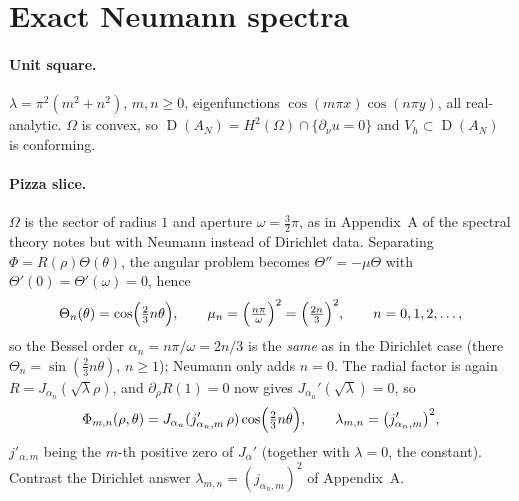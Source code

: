 \documentclass[11pt,a4paper]{article}
\DeclareMathOperator{\dom}{D}
\begin{document}
\section{Exact Neumann spectra}

\paragraph{Unit square.} $\lambda = \pi^2(m^2+n^2)$, $m,n\ge 0$, eigenfunctions
$\cos(m\pi x)\cos(n\pi y)$, all real-analytic. $\Omega$ is convex, so
$\dom(A_N) = H^2(\Omega)\cap\{\partial_\nu u = 0\}$ and $V_h \subset \dom(A_N)$
is conforming.

\paragraph{Pizza slice.} $\Omega$ is the sector of radius $1$ and aperture
$\omega = \tfrac32\pi$, as in Appendix~A of the spectral theory notes but with
Neumann instead of Dirichlet data. Separating $\Phi = R(\rho)\Theta(\theta)$,
the angular problem becomes $\Theta'' = -\mu\Theta$ with
$\Theta'(0)=\Theta'(\omega)=0$, hence
\begin{equation}
  \Theta_n(\theta) = \cos\Bigl(\tfrac{2}{3}n\theta\Bigr),
  \qquad
  \mu_n = \Bigl(\tfrac{n\pi}{\omega}\Bigr)^2 = \Bigl(\tfrac{2n}{3}\Bigr)^2,
  \qquad n = 0,1,2,\dots,
\end{equation}
so the Bessel order $\alpha_n = n\pi/\omega = 2n/3$ is the \emph{same} as in the
Dirichlet case (there $\Theta_n = \sin(\tfrac23 n\theta)$, $n \ge 1$); Neumann
only adds $n=0$. The radial factor is again $R = J_{\alpha_n}(\sqrt\lambda\rho)$,
and $\partial_\rho R(1) = 0$ now gives $J_{\alpha_n}'(\sqrt\lambda) = 0$, so
\begin{equation}
  \Phi_{m,n}(\rho,\theta) = J_{\alpha_n}(j'_{\alpha_n,m}\,\rho)\cos\Bigl(\tfrac23 n\theta\Bigr),
  \qquad
  \lambda_{m,n} = \bigl(j'_{\alpha_n,m}\bigr)^2,
\end{equation}
$j'_{\alpha,m}$ being the $m$-th positive zero of $J_\alpha'$ (together with
$\lambda = 0$, the constant). Contrast the Dirichlet answer
$\lambda_{m,n} = (j_{\alpha_n,m})^2$ of Appendix~A.
\end{document}
